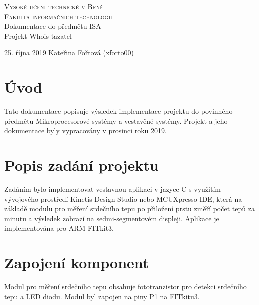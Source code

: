 \documentclass[a4paper, 11pt]{article}
\begin{document}
\begin{titlepage}
\begin{center}
\textsc{\Huge Vysoké učení technické v Brně\\ \medskip
\huge Fakulta informačních technologií}\\
\LARGE Dokumentace do předmětu ISA\\
\Huge  Projekt Whois tazatel\\
\begin{Large}
25. října 2019\hfill
Kateřina Fořtová (xforto00)
\end{Large}
\end{center}



\end{titlepage}

\tableofcontents
\newpage
\section{Úvod}
Tato dokumentace popisuje výsledek implementace projektu do povinného předmětu Mikroprocesorové systémy a vestavěné systémy. Projekt a jeho dokumentace byly vypracovány v prosinci roku 2019.
\section{Popis zadání projektu}
Zadáním bylo implementovat vestavnou aplikaci v jazyce C s využitím vývojového prostředí Kinetis Design Studio nebo MCUXpresso IDE, která na základě modulu pro měření srdečního tepu po přiložení prstu změří počet tepů za minutu a výsledek zobrazí na sedmi-segmentovém displeji. Aplikace je implementována pro ARM-FITkit3.
\section{Zapojení komponent}
Modul pro měření srdečního tepu obsahuje fototranzistor pro detekci srdečního tepu a LED diodu. Modul byl zapojen na piny P1 na FITkitu3.
\end{document}

